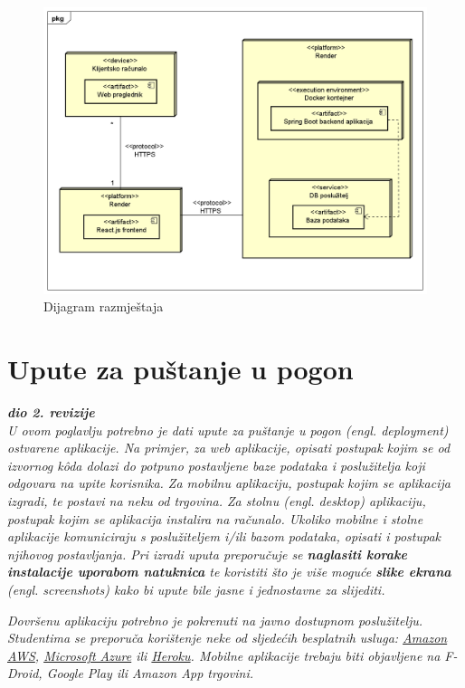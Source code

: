 			\begin{figure}[H]
				\includegraphics[width=\textwidth]{dijagrami/DeploymentDiagram.PNG} 
				\caption{Dijagram razmještaja}
				\label{fig:DeploymentDiagram}
			\end{figure}
			
			\eject 
		
		\section{Upute za puštanje u pogon}
		
			\textbf{\textit{dio 2. revizije}}\\
		
			 \textit{U ovom poglavlju potrebno je dati upute za puštanje u pogon (engl. deployment) ostvarene aplikacije. Na primjer, za web aplikacije, opisati postupak kojim se od izvornog kôda dolazi do potpuno postavljene baze podataka i poslužitelja koji odgovara na upite korisnika. Za mobilnu aplikaciju, postupak kojim se aplikacija izgradi, te postavi na neku od trgovina. Za stolnu (engl. desktop) aplikaciju, postupak kojim se aplikacija instalira na računalo. Ukoliko mobilne i stolne aplikacije komuniciraju s poslužiteljem i/ili bazom podataka, opisati i postupak njihovog postavljanja. Pri izradi uputa preporučuje se \textbf{naglasiti korake instalacije uporabom natuknica} te koristiti što je više moguće \textbf{slike ekrana} (engl. screenshots) kako bi upute bile jasne i jednostavne za slijediti.}
			
			
			 \textit{Dovršenu aplikaciju potrebno je pokrenuti na javno dostupnom poslužitelju. Studentima se preporuča korištenje neke od sljedećih besplatnih usluga: \href{https://aws.amazon.com/}{Amazon AWS}, \href{https://azure.microsoft.com/en-us/}{Microsoft Azure} ili \href{https://www.heroku.com/}{Heroku}. Mobilne aplikacije trebaju biti objavljene na F-Droid, Google Play ili Amazon App trgovini.}
			
			
			\eject 